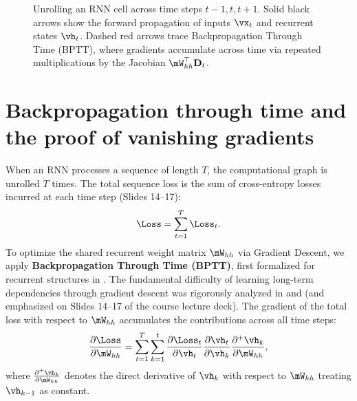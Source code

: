 \documentclass[../../main.tex]{subfiles}
\begin{document}
\begin{figure}[htbp]
{%
}
\caption{Unrolling an RNN cell across time steps $t-1, t, t+1$. Solid black arrows show the forward propagation of inputs $\vx_t$ and recurrent states $\vh_t$. Dashed red arrows trace Backpropagation Through Time (BPTT), where gradients accumulate across time via repeated multiplications by the Jacobian $\mW_{hh}^\top \mathbf{D}_t$.}
\label{fig:unrolled_rnn}
\end{figure}

\section{Backpropagation through time and the proof of vanishing gradients}
\label{sec:bptt_proof}

When an RNN processes a sequence of length $T$, the computational graph is unrolled $T$ times. The total sequence loss is the sum of cross-entropy losses incurred at each time step (Slides 14--17):
\begin{equation}
\label{eq:total_rnn_loss}
\Loss = \sum_{t=1}^T \Loss_t.
\end{equation}
To optimize the shared recurrent weight matrix $\mW_{hh}$ via Gradient Descent, we apply \textbf{Backpropagation Through Time (BPTT)}, first formalized for recurrent structures in \cite{werbos1990}. The fundamental difficulty of learning long-term dependencies through gradient descent was rigorously analyzed in \cite{bengio1994} and \cite{pascanu2013difficulty} (and emphasized on Slides 14--17 of the course lecture deck). The gradient of the total loss with respect to $\mW_{hh}$ accumulates the contributions across all time steps:
\begin{equation}
\label{eq:bptt_grad_whh}
\frac{\partial \Loss}{\partial \mW_{hh}} = \sum_{t=1}^T \sum_{k=1}^t \frac{\partial \Loss_t}{\partial \vh_t} \frac{\partial \vh_t}{\partial \vh_k} \frac{\partial^+ \vh_k}{\partial \mW_{hh}},
\end{equation}
where $\frac{\partial^+ \vh_k}{\partial \mW_{hh}}$ denotes the direct derivative of $\vh_k$ with respect to $\mW_{hh}$ treating $\vh_{k-1}$ as constant.
\end{document}
